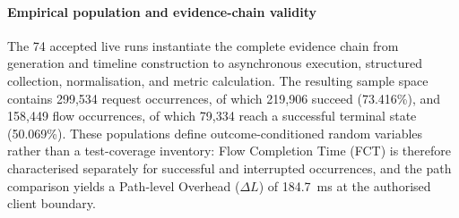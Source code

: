 \paragraph{Empirical population and evidence-chain validity}
\noindent The 74 accepted live runs instantiate the complete evidence chain from
generation and timeline construction to asynchronous execution, structured
collection, normalisation, and metric calculation. The resulting sample space
contains 299{,}534 request occurrences, of which 219{,}906 succeed (73.416\%),
and 158{,}449 flow occurrences, of which 79{,}334 reach a successful terminal
state (50.069\%). These populations define outcome-conditioned random variables
rather than a test-coverage inventory: Flow Completion Time (FCT) is therefore
characterised separately for successful and interrupted occurrences, and the
path comparison yields a Path-level Overhead ($\Delta L$) of
184.7~ms at the authorised client boundary.

